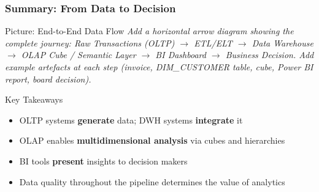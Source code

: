 \begin{frame}
  \frametitle{Summary: From Data to Decision}

  \begin{alertblock}{Picture: End-to-End Data Flow}
    \textit{Add a horizontal arrow diagram showing the complete journey:
    Raw Transactions (OLTP) $\to$ ETL/ELT $\to$ Data Warehouse
    $\to$ OLAP Cube / Semantic Layer $\to$ BI Dashboard
    $\to$ Business Decision.
    Add example artefacts at each step (invoice, DIM\_CUSTOMER table,
    cube, Power BI report, board decision).}
  \end{alertblock}

  \begin{block}{Key Takeaways}
    \begin{itemize}
      \item OLTP systems \textbf{generate} data; DWH systems \textbf{integrate} it
      \item OLAP enables \textbf{multidimensional analysis} via cubes and hierarchies
      \item BI tools \textbf{present} insights to decision makers
      \item Data quality throughout the pipeline determines the value of analytics
    \end{itemize}
  \end{block}

\end{frame}
